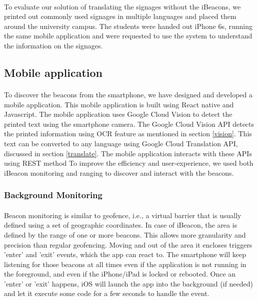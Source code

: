 \documentclass[12pt]{article}
\begin{document}
\paragraph{}To evaluate our solution of translating the signages without the iBeacons, we printed out commonly used  signages in multiple languages and placed them around the university campus. The students were handed out iPhone 6s, running the same mobile application and were requested to use the system to understand the information on the signages.


\subsection{Mobile application}

\paragraph{}
To discover the beacons from the smartphone, we have designed and developed a mobile application. This mobile application is built using React native and Javascript. The mobile application uses Google Cloud Vision to detect the printed text using the smartphone camera. The Google Cloud Vision API detects the printed information using OCR feature as mentioned in section  \ref{vision}. This text can be converted to any language using Google Cloud Translation API, discussed in section \ref{translate}. The mobile application interacts with these APIs using REST method  To improve the efficiency and user-experience, we used both iBeacon monitoring and ranging to discover and interact with the beacons.


\subsubsection{Background Monitoring}
\paragraph{}Beacon monitoring is similar to geofence, i.e., a virtual barrier that is usually defined using a set of geographic coordinates. In case of iBeacon, the area is defined by the range of one or more beacons. This allows more granularity and precision than regular geofencing. Moving and out of the area it encloses triggers ’enter’ and ’exit’ events, which the app can react to. The smartphone will keep listening for those beacons at all times even if the application is not running in the foreground, and even if the iPhone/iPad is locked or rebooted. Once an ’enter’ or ’exit’ happens, iOS will launch the app into the background (if needed) and let it execute some code for a few seconds to handle the event.
\end{document}
